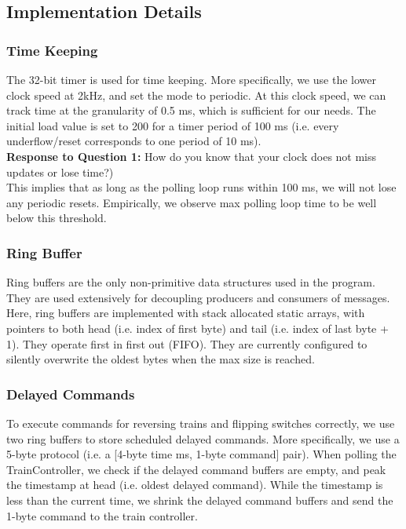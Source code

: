 \documentclass[11pt]{article}
\begin{document}
\subsection{Implementation Details}
\subsubsection{Time Keeping}
The 32-bit timer is used for time keeping. More specifically, we use the lower clock speed at 2kHz, and set the mode to periodic. At this clock speed, we can track time at the granularity of 0.5 ms, which is sufficient for our needs. The initial load value is set to 200 for a timer period of 100 ms (i.e. every underflow/reset corresponds to one period of 10 ms).\\

\noindent
\textbf{Response to Question 1:} How do you know that your clock does not miss updates or lose
time?) \\

\noindent
This implies that as long as the polling loop runs within 100 ms, we will not lose any periodic resets. Empirically, we observe max polling loop time to be well below this threshold.

\subsubsection{Ring Buffer}
Ring buffers are the only non-primitive data structures used in the program. They are used extensively for decoupling producers and consumers of messages. Here, ring buffers are implemented with stack allocated static arrays, with pointers to both head (i.e. index of first byte) and tail (i.e. index of last byte + 1). They operate first in first out (FIFO). They are currently configured to silently overwrite the oldest bytes when the max size is reached.

\subsubsection{Delayed Commands}
To execute commands for reversing trains and flipping switches correctly, we use two ring buffers to store scheduled delayed commands. More specifically, we use a 5-byte protocol (i.e. {a [4-byte time ms, 1-byte command]} pair). When polling the TrainController, we check if the delayed command buffers are empty, and peak the timestamp at head (i.e. oldest delayed command). While the timestamp is less than the current time, we shrink the delayed command buffers and send the 1-byte command to the train controller.
\end{document}
